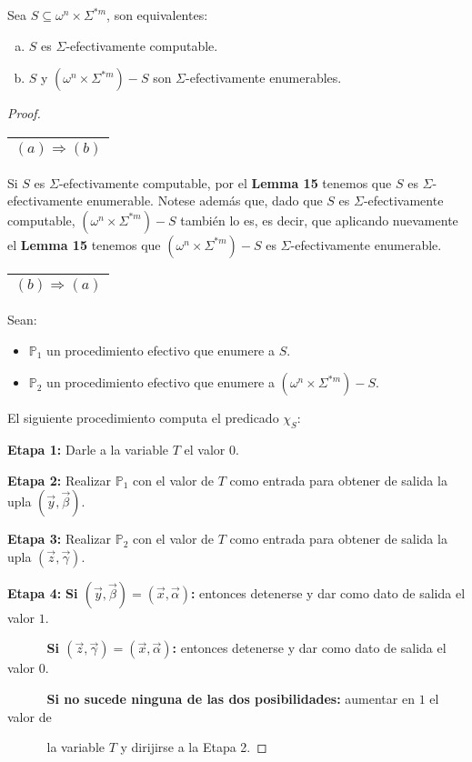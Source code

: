   \begin{theorem}
    \PN Sea $S \subseteq \omega^{n}\times \Sigma^{\ast m}$, son equivalentes:

    \begin{enumerate}[a)]
      \item $S$ es $\Sigma$-efectivamente computable.
      \item $S$ y $(\omega^{n}\times \Sigma^{\ast m})-S$ son $\Sigma$-efectivamente enumerables.
    \end{enumerate}
  \end{theorem}
  \begin{proof}
    \begin{tabular}{|c|}\hline $(a) \Rightarrow (b)$\\\hline\end{tabular} Si $S$ es $\Sigma$-efectivamente computable,
    por el \textbf{Lemma 15} tenemos que $S$ es $\Sigma$-efectivamente enumerable. Notese además que, dado que $S$ es
    $\Sigma$-efectivamente computable, $(\omega^{n} \times \Sigma^{\ast m}) - S$ también lo es, es decir, que aplicando
    nuevamente el \textbf{Lemma 15} tenemos que $(\omega^{n} \times \Sigma^{\ast m})-S$ es
    $\Sigma$-efectivamente enumerable.

    \vspace{3mm}
    \PN \begin{tabular}{|c|}\hline $(b) \Rightarrow (a)$\\\hline\end{tabular} Sean:

    \begin{itemize}
      \item $\mathbb{P}_{1}$ un procedimiento efectivo que enumere a $S$.
      \item $\mathbb{P}_{2}$ un procedimiento efectivo que enumere a $(\omega^{n}\times \Sigma^{\ast m}) - S$.
    \end{itemize}

    \PN El siguiente procedimiento computa el predicado $\chi_{S}$:

    \vspace{3mm}
    \PN \textbf{Etapa 1:}
    Darle a la variable $T$ el valor $0$.

    \PN \textbf{Etapa 2:}
    Realizar $\mathbb{P}_{1}$ con el valor de $T$ como entrada para obtener de salida la upla $(\vec{y}, \vec{\beta})$.

    \PN \textbf{Etapa 3:}
    Realizar $\mathbb{P}_{2}$ con el valor de $T$ como entrada para obtener de salida la upla $(\vec{z}, \vec{\gamma})$.

    \PN \textbf{Etapa 4:}
    \textbf{Si $(\vec{y}, \vec{\beta}) = (\vec{x}, \vec{\alpha})$:} entonces detenerse y dar como dato de salida el
    valor $1$.

    $\qquad\;\;\;\;$\textbf{Si $(\vec{z}, \vec{\gamma}) = (\vec{x}, \vec{\alpha})$:} entonces detenerse y dar como
    dato de salida el valor $0$.

    $\qquad\;\;\;\;$\textbf{Si no sucede ninguna de las dos posibilidades:} aumentar en $1$ el valor de

    $\qquad\;\;\;\;$la variable $T$ y dirijirse a la Etapa 2.
  \end{proof}

